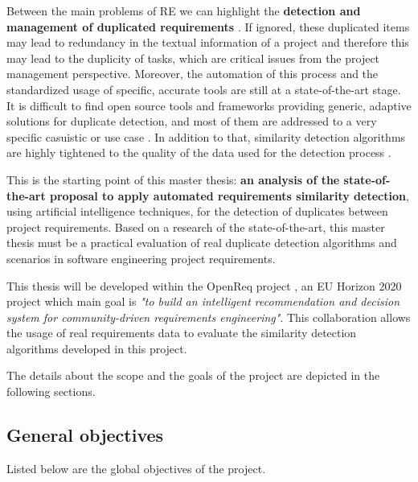 \documentclass[11pt]{article}
\begin{document}
Between the main problems of RE we can highlight the \textbf{detection and management of duplicated requirements} \cite{b4}. If ignored, these duplicated items may lead to redundancy in the textual information of a project and therefore this may lead to the duplicity of tasks, which are critical issues from the project management perspective. Moreover, the automation of this process and the standardized usage of specific, accurate tools are still at a state-of-the-art stage. It is difficult to find open source tools and frameworks providing generic, adaptive solutions for duplicate detection, and most of them are addressed to a very specific casuistic or use case \cite{b5}. In addition to that, similarity detection algorithms are highly tightened to the quality of the data used for the detection process \cite{b6}.

This is the starting point of this master thesis: \textbf{an analysis of the state-of-the-art proposal to apply automated requirements similarity detection}, using artificial intelligence techniques, for the detection of duplicates between project requirements. Based on a research of the state-of-the-art, this master thesis must be a practical evaluation of real duplicate detection algorithms and scenarios in software engineering project requirements.

This thesis will be developed within the OpenReq project \cite{b7}, an EU Horizon 2020 project which main goal is \textit{"to build an intelligent recommendation and decision system for community-driven require­ments engineering"}. This collaboration allows the usage of real requirements data to evaluate the similarity detection algorithms developed in this project.

The details about the scope and the goals of the project are depicted in the following sections.

\subsection{General objectives}
\label{sec:main_objectives}

Listed below are the global objectives of the project.
\end{document}
